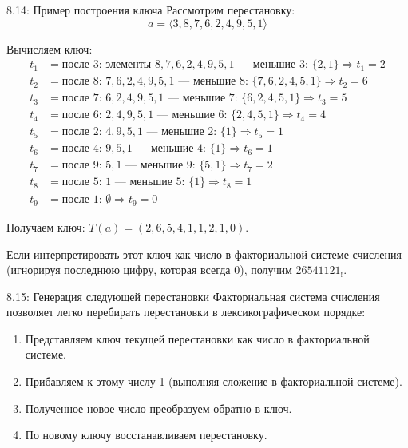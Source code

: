 \documentclass[a4paper,12pt]{article}
\begin{document}
	\begin{examplebox}{8.14: Пример построения ключа}
		Рассмотрим перестановку:
		\[ a = \langle 3, 8, 7, 6, 2, 4, 9, 5, 1 \rangle \]
		
		Вычисляем ключ:
		\begin{align*}
			t_1 &= \text{после 3: элементы } 8,7,6,2,4,9,5,1 \text{ — меньшие 3: } \{2,1\} \Rightarrow t_1 = 2 \\
			t_2 &= \text{после 8: } 7,6,2,4,9,5,1 \text{ — меньшие 8: } \{7,6,2,4,5,1\} \Rightarrow t_2 = 6 \\
			t_3 &= \text{после 7: } 6,2,4,9,5,1 \text{ — меньшие 7: } \{6,2,4,5,1\} \Rightarrow t_3 = 5 \\
			t_4 &= \text{после 6: } 2,4,9,5,1 \text{ — меньшие 6: } \{2,4,5,1\} \Rightarrow t_4 = 4 \\
			t_5 &= \text{после 2: } 4,9,5,1 \text{ — меньшие 2: } \{1\} \Rightarrow t_5 = 1 \\
			t_6 &= \text{после 4: } 9,5,1 \text{ — меньшие 4: } \{1\} \Rightarrow t_6 = 1 \\
			t_7 &= \text{после 9: } 5,1 \text{ — меньшие 9: } \{5,1\} \Rightarrow t_7 = 2 \\
			t_8 &= \text{после 5: } 1 \text{ — меньшие 5: } \{1\} \Rightarrow t_8 = 1 \\
			t_9 &= \text{после 1: } \emptyset \Rightarrow t_9 = 0
		\end{align*}
		
		Получаем ключ: $T(a) = (2, 6, 5, 4, 1, 1, 2, 1, 0)$.
		
		Если интерпретировать этот ключ как число в факториальной системе счисления (игнорируя последнюю цифру, которая всегда 0), получим $26541121_{!}$.
	\end{examplebox}
	
	\begin{algorithmbox}{8.15: Генерация следующей перестановки}
		Факториальная система счисления позволяет легко перебирать перестановки в лексикографическом порядке:
		
		\begin{enumerate}
			\item Представляем ключ текущей перестановки как число в факториальной системе.
			\item Прибавляем к этому числу 1 (выполняя сложение в факториальной системе).
			\item Полученное новое число преобразуем обратно в ключ.
			\item По новому ключу восстанавливаем перестановку.
		\end{enumerate}
	\end{algorithmbox}
	
\end{document}
